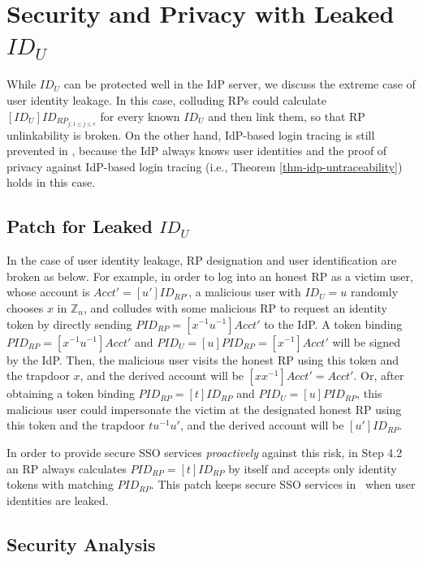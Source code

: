 \appendix

\section{Security and Privacy with Leaked $ID_U$}
\label{sp-leak-uid}
While $ID_U$ can be protected well in the IdP server, 
    we discuss the extreme case of user identity leakage.
In this case,
    colluding RPs could calculate $[ID_U]ID_{RP_{j;1\leq j \leq c}}$ for every known $ID_U$ and then link them,
so that RP unlinkability is broken.
On the other hand, IdP-based login tracing is still prevented in \usso,
    because the IdP always knows user identities and the proof of privacy against IdP-based login tracing (i.e., Theorem \ref{thm-idp-untraceability}) holds in this case.

\subsection{Patch for Leaked $ID_U$}
In the case of user identity leakage,
RP designation and user identification are broken as below.
For example, in order to log into an honest RP as a victim user, whose account is $Acct' = [u']ID_{RP'}$,
    a malicious user with $ID_U = u$ randomly chooses $x$ in $\mathbb{Z}_n$,
    and colludes with some malicious RP to request an identity token by directly sending $PID_{RP} = [x^{-1}u^{-1}]Acct'$ to the IdP.
A token binding $PID_{RP} = [x^{-1}u^{-1}]Acct'$ and $PID_U = [u]PID_{RP} = [x^{-1}]Acct'$ will be signed by the IdP.
Then, the malicious user visits the honest RP using this token and the trapdoor $x$,
    and the derived account will be $[xx^{-1}]Acct'=Acct'$.
Or, after obtaining a token binding $PID_{RP} = [t]ID_{RP}$ and $PID_U = [u]PID_{RP}$,
    this malicious user could impersonate the victim at the designated honest RP
     using this token and the trapdoor $tu^{-1}u'$, and the derived account will be $[u']ID_{RP}$.

In order to provide secure SSO services \emph{proactively} against this risk,
     in Step 4.2 an RP always calculates $PID_{RP} = [t]ID_{RP}$ by itself and
        accepts only identity tokens with matching $PID_{RP}$.
This patch keeps secure SSO services in \usso\ when user identities are leaked.

\subsection{Security Analysis}
\label{proof-rp-collision}

